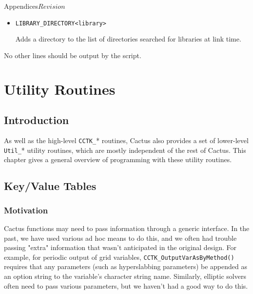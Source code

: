\begin{cactuspart}{Appendices}{}{$Revision$}
\begin{itemize}
Adds a library to the final cactus link.

\item

\begin{alltt}
LIBRARY_DIRECTORY <library>
\end{alltt}

Adds a directory to the list of directories searched for libraries at
link time.

\end{itemize}

No other lines should be output by the script.


\chapter{Utility Routines}

\section{Introduction}

As well as the high-level \verb|CCTK_|* routines, Cactus also
provides a set of lower-level \verb|Util_|* utility routines, which
are mostly independent of the rest of Cactus.  This chapter gives a
general overview of programming with these utility routines.


\section{Key/Value Tables}


\subsection{Motivation}

Cactus functions may need to pass information through a generic
interface.  In the past, we have used various ad hoc means to do this,
and we often had trouble passing "extra" information that wasn't
anticipated in the original design.  For example, for periodic output
of grid variables,
\verb|CCTK_OutputVarAsByMethod()| requires that
any parameters (such as hyperslabbing parameters) be appended as an option
string to the variable's character string name.  Similarly, elliptic
solvers often need to pass various parameters, but we haven't had a
good way to do this.


\end{cactuspart}
